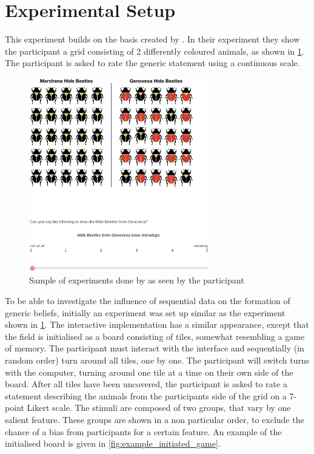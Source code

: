 \documentclass[twoside]{uva-inf-bachelor-thesis}
\theoremstyle{definition}
\begin{document}
\section{Experimental Setup}
This experiment builds on the basis created by \cite{RooijSchulzGenAlt}. In their experiment they show the participant a grid consisting of 2 differently coloured animals, as shown in \ref{fig:beetle_example}. The participant is asked to rate the generic statement using a continuous scale.
\begin{figure}[h]
    \centering
    \includegraphics[width=0.7\textwidth]{Project/Thesis/LaTeX/images/beetles_example.png}
    \caption{Sample of experiments done by \cite{RooijSchulzGenAlt} as seen by the participant}
    \label{fig:beetle_example}
\end{figure}
To be able to investigate the influence of sequential data on the formation of generic beliefs, initially an experiment was set up similar as the experiment shown in \ref{fig:beetle_example}. The interactive implementation has a similar appearance, except that the field is initialised as a board consisting of tiles, somewhat resembling a game of memory. The participant must interact with the interface and sequentially (in random order) turn around all tiles, one by one. The participant will switch turns with the computer, turning around one tile at a time on their own side of the board. After all tiles have been uncovered, the participant is asked to rate a statement describing the animals from the participants side of the grid on a 7-point Likert scale. The stimuli are composed of two groups, that vary by one salient feature. These groups are shown in a non particular order, to exclude the chance of a bias from participants for a certain feature. An example of the initialised board is given in \ref{fig:example_initiated_game}.
\end{document}

